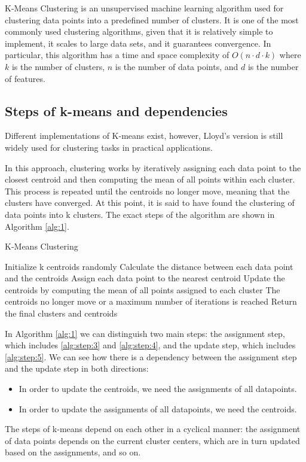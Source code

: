 K-Means Clustering is an unsupervised machine learning algorithm used for clustering data points into a predefined number of clusters. It is one of the most commonly used clustering algorithms, given that it is relatively simple to implement, it scales to large data sets, and it guarantees convergence. In particular, this algorithm has a time and space complexity of $O(n\cdot d\cdot k)$ where $k$ is the number of clusters, $n$ is the number of data points, and $d$ is the number of features.
\subsection{Steps of k-means and dependencies}

Different implementations of K-means exist, however, Lloyd's version is still widely used for clustering tasks in practical applications.

In this approach, clustering works by iteratively assigning each data point to the closest centroid and then computing the mean of all points within each cluster. This process is repeated until the centroids no longer move, meaning that the clusters have converged. At this point, it is said to have found the clustering of data points into k clusters. The exact steps of the algorithm are shown in Algorithm \ref{alg:1}.

\begin{algorithm}
\caption{K-Means Clustering}
\begin{algorithmic}[1]
    \State Initialize k centroids randomly
    \Repeat
    \State Calculate the distance between each data point and the centroids
    \label{alg:step:3}
    \State Assign each data point to the nearest centroid
    \label{alg:step:4}
    \State Update the centroids by computing the mean of all points assigned to each cluster
    \label{alg:step:5}
    \Until The centroids no longer move or a maximum number of iterations is reached
    \State Return the final clusters and centroids
\end{algorithmic}
\label{alg:1}
\end{algorithm}

In Algorithm \ref{alg:1}  we can distinguish two main steps: the assignment step, which includes \ref{alg:step:3} and \ref{alg:step:4}, and the update step, which includes \ref{alg:step:5}.
We can see how there is a dependency between the assignment step and the update step in both directions:
\begin{itemize}
    \item In order to update the centroids, we need the assignments of all datapoints.
    \item In order to update the assignments of all datapoints, we need the centroids.
\end{itemize}
The steps of k-means depend on each other in a cyclical manner: the assignment of data points depends on the current cluster centers, which are in turn updated based on the assignments, and so on.

